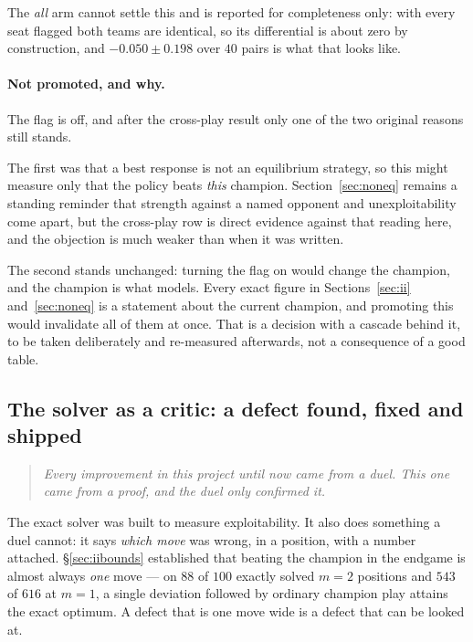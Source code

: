 \documentclass[11pt,letterpaper]{article}
\begin{document}
The \emph{all} arm cannot settle this and is reported for completeness only:
with every seat flagged both teams are identical, so its differential is about
zero by construction, and $-0.050 \pm 0.198$ over $40$ pairs is what that looks
like.

\paragraph{Not promoted, and why.} The flag is off, and after the cross-play
result only one of the two original reasons still stands.

The first was that a best response is not an equilibrium strategy, so this
might measure only that the policy beats \emph{this} champion.
Section~\ref{sec:noneq} remains a standing reminder that strength against a
named opponent and unexploitability come apart, but the cross-play row is
direct evidence against that reading here, and the objection is much weaker
than when it was written.

The second stands unchanged: turning the flag on would change the champion, and
the champion is what  models. Every exact figure in
Sections~\ref{sec:ii} and~\ref{sec:noneq} is a statement about the current
champion, and promoting this would invalidate all of them at once. That is a
decision with a cascade behind it, to be taken deliberately and re-measured
afterwards, not a consequence of a good table.

\subsection{The solver as a critic: a defect found, fixed and shipped}
\label{sec:critic}

\begin{quote}
\emph{Every improvement in this project until now came from a duel. This one
came from a proof, and the duel only confirmed it.}
\end{quote}

The exact solver was built to measure exploitability. It also does something a
duel cannot: it says \emph{which move} was wrong, in a position, with a number
attached. \S\ref{sec:iibounds} established that beating the champion in the
endgame is almost always \emph{one} move --- on $88$ of $100$ exactly solved
$m = 2$ positions and $543$ of $616$ at $m = 1$, a single deviation followed by
ordinary champion play attains the exact optimum. A defect that is one move
wide is a defect that can be looked at.
\end{document}
